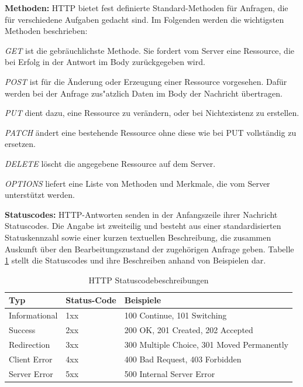 \noindent
{}
\textbf{Methoden:}
HTTP bietet fest definierte Standard-Methoden für Anfragen, die für verschiedene Aufgaben gedacht sind. Im Folgenden werden die wichtigsten Methoden beschrieben:
\begin{itemize}
{\setlength\itemindent{1cm}\item\textit{GET} ist die gebräuchlichste Methode. Sie fordert vom Server eine Ressource, die bei Erfolg in der Antwort im Body zurückgegeben wird.}
		
		\item \textit{POST} ist für die Änderung oder Erzeugung einer Ressource vorgesehen. Dafür werden bei der Anfrage zus"atzlich Daten im Body der Nachricht übertragen.
		
		\item \textit{PUT} dient dazu, eine Ressource zu verändern, oder bei Nichtexistenz zu erstellen.
	
		\item \textit{PATCH} ändert eine bestehende Ressource ohne diese wie bei PUT vollständig zu ersetzen. 
		
		\item \textit{DELETE} löscht die angegebene Ressource auf dem Server.
		
		\item \textit{OPTIONS} liefert eine Liste von Methoden und Merkmale, die vom Server unterstützt werden.
		
\end{itemize}
\newpage
\noindent
{}
\textbf{Statuscodes:}
HTTP-Antworten senden in der Anfangszeile ihrer Nachricht Statuscodes. Die Angabe ist zweiteilig und besteht aus einer standardisierten Statuskennzahl sowie einer kurzen textuellen Beschreibung, die zusammen Auskunft über den Bearbeitungszustand der zugehörigen Anfrage geben. Tabelle \ref{tab:HTTPStatuscode} stellt die Statuscodes und ihre Beschreiben anhand von Beispielen dar. \newline

\begin{table}[tbt]
\caption{HTTP Statuscodebeschreibungen}
\label{tab:HTTPStatuscode}
\begin{center}
    \begin{tabular}{ l  l   p{8cm} }
    \toprule
    Typ & Status-Code & Beispiele \\
    \midrule
    
    Informational & 1xx & 100 Continue, 101 Switching\\

    Success & 2xx & 200 OK, 201 Created, 202 Accepted  \\

	Redirection & 3xx & 300 Multiple Choice, 301 Moved Permanently  \\

    Client Error & 4xx & 400 Bad Request, 403 Forbidden\\ 

    Server Error & 5xx & 500 Internal Server Error \\
    \bottomrule
    \end{tabular}
\end{center}
\end{table}

